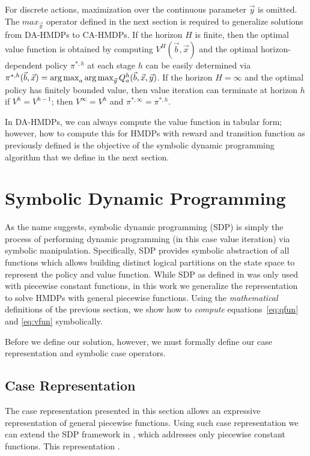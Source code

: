\documentclass[twoside,11pt]{article}
\def\argmax{\operatornamewithlimits{arg\max}}
\begin{document}
For discrete actions, maximization over the continuous parameter $\vec{y}$ is omitted. The $max_{\vec{y}}$ operator defined in the next section is required to generalize solutions from DA-HMDPs to CA-HMDPs.
If the horizon $H$ is finite, then the optimal value function is
obtained by computing $V^H(\vec{b},\vec{x})$ and the optimal
horizon-dependent policy $\pi^{*,h}$ at each stage $h$ can be easily
determined via $\pi^{*,h}(\vec{b},\vec{x}) = \argmax_a
\argmax_{\vec{y}} Q^h_a(\vec{b},\vec{x},\vec{y})$.  If the horizon $H
= \infty$ and the optimal policy has finitely bounded value, then
value iteration can terminate at horizon $h$ if $V^{h} = V^{h-1}$;
then $V^\infty = V^h$ and $\pi^{*,\infty} = \pi^{*,h}$.

In DA-HMDPs, we can always compute the value function in tabular form;
however, how to compute this for HMDPs with reward and transition
function as previously defined is the objective of the symbolic
dynamic programming algorithm that we define in the next section.

\section{Symbolic Dynamic Programming} \label{SDP}
As the name suggests, symbolic dynamic programming (SDP) \cite{fomdp}
is simply the process of performing dynamic programming (in this case
value iteration) via symbolic manipulation. Specifically, SDP provides symbolic abstraction of all functions which allows building distinct logical partitions on the state space to represent the policy and value function. While SDP as defined
in \cite{fomdp} was only used with piecewise
constant functions, in this work we generalize the representation to solve HMDPs with
general piecewise functions. Using the \emph{mathematical} definitions of the previous section, we  
show how to \emph{compute} equations~\eqref{eq:qfun} and \eqref{eq:vfun} 
symbolically.

Before we define our solution, however, we must formally define our
case representation and symbolic case operators.

\subsection{Case Representation}
\label{sec:caserep}
The case representation presented in this section allows an expressive representation of general piecewise functions. Using such case representation we can extend the SDP framework in \cite{fomdp}, which addresses only piecewise constant functions. This representation .
\end{document}
